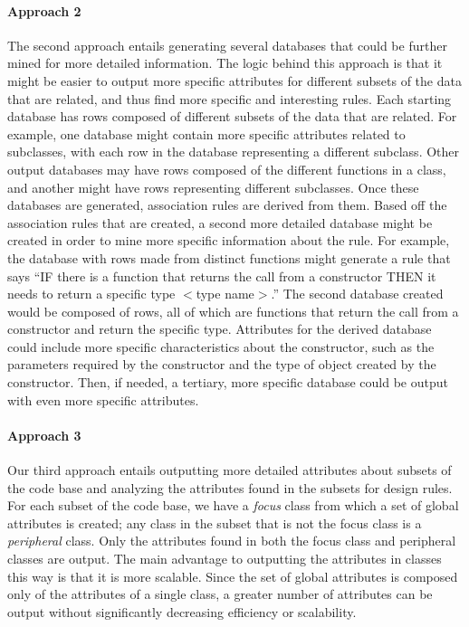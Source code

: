 \documentclass[12pt]{article}
\begin{document}
	\paragraph{Approach 2}
	
	The second approach entails generating several databases that could be further mined for more detailed information. The logic behind this approach is that it might be easier to output more specific attributes for different subsets of the data that are related, and thus find more specific and interesting rules. Each starting database has rows composed of different subsets of the data that are related. For example, one database might contain more specific attributes related to subclasses, with each row in the database representing a different subclass. Other output databases may have rows composed of the different functions in a class, and another might have rows representing different subclasses. Once these databases are generated, association rules are derived from them. Based off the association rules that are created, a second more detailed database might be created in order to mine more specific information about the rule. For example, the database with rows made from distinct functions might generate a rule that says “IF there is a function that returns the call from a constructor THEN it needs to return a specific type $<$type name$>$.” The second database created would be composed of rows, all of which are functions that return the call from a constructor and return the specific type. Attributes for the derived database could include more specific characteristics about the constructor, such as the parameters required by the constructor and the type of object created by the constructor. Then, if needed, a tertiary, more specific database could be output with even more specific attributes.

	\paragraph{Approach 3}
	
	Our third approach entails outputting more detailed attributes about subsets of the code base and analyzing the attributes found in the subsets for design rules. For each subset of the code base, we have a \textit{focus} class from which a set of global attributes is created; any class in the subset that is not the focus class is a \textit{peripheral} class. Only the attributes found in both the focus class and peripheral classes are output. The main advantage to outputting the attributes in classes this way is that it is more scalable. Since the set of global attributes is composed only of the attributes of a single class, a greater number of attributes can be output without significantly decreasing efficiency or scalability.
	
\end{document}
